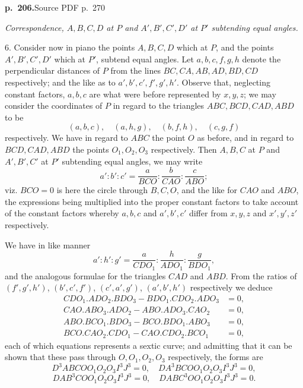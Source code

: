 \documentclass[11pt,a4paper]{article}
\newcommand{\sourcepage}[2]{\par\bigskip\noindent\textbf{p.~#1.}\hfill{\footnotesize Source PDF p.~#2}\par\nobreak\medskip}
\begin{document}
\sourcepage{206}{270}
\begin{center}\textit{Correspondence, $A,B,C,D$ at $P$ and $A',B',C',D'$ at $P'$ subtending equal angles.}\end{center}

6. Consider now in piano the points $A,B,C,D$ which at $P$, and the points $A',B',C',D'$ which at $P'$, subtend equal angles. Let $a,b,c,f,g,h$ denote the perpendicular distances of $P$ from the lines $BC,CA,AB,AD,BD,CD$ respectively; and the like as to $a',b',c',f',g',h'$. Observe that, neglecting constant factors, $a,b,c$ are what were before represented by $x,y,z$; we may consider the coordinates of $P$ in regard to the triangles $ABC,BCD,CAD,ABD$ to be
\[
(a,b,c),\quad (a,h,g),\quad (b,f,h),\quad (c,g,f)
\]
respectively. We have in regard to $ABC$ the point $O$ as before, and in regard to $BCD,CAD,ABD$ the points $O_1,O_2,O_3$ respectively. Then $A,B,C$ at $P$ and $A',B',C'$ at $P'$ subtending equal angles, we may write
\[
a':b':c'=\frac{a}{BCO}:\frac{b}{CAO}:\frac{c}{ABO};
\]
viz. $BCO=0$ is here the circle through $B,C,O$, and the like for $CAO$ and $ABO$, the expressions being multiplied into the proper constant factors to take account of the constant factors whereby $a,b,c$ and $a',b',c'$ differ from $x,y,z$ and $x',y',z'$ respectively.

We have in like manner
\[
a':h':g'=\frac{a}{CDO_1}:\frac{h}{ADO_1}:\frac{g}{BDO_1},
\]
and the analogous formulae for the triangles $CAD$ and $ABD$. From the ratios of $(f',g',h')$, $(b',c',f')$, $(c',a',g')$, $(a',b',h')$ respectively we deduce
\begin{align*}
CDO_1.ADO_2.BDO_3-BDO_1.CDO_2.ADO_3&=0,\\
CAO.ABO_3.ADO_2-ABO.ADO_3.CAO_2&=0,\\
ABO.BCO_1.BDO_3-BCO.BDO_1.ABO_3&=0,\\
BCO.CAO_2.CDO_1-CAO.CDO_2.BCO_1&=0,
\end{align*}
each of which equations represents a sextic curve; and admitting that it can be shown that these pass through $O,O_1,O_2,O_3$ respectively, the forms are
\[
D^3ABCOO_1O_2O_3I^3J^3=0,\quad
DA^3BCOO_1O_2O_3I^3J^3=0,
\]
\[
DAB^3COO_1O_2O_3I^3J^3=0,\quad
DABC^3OO_1O_2O_3I^3J^3=0.
\]
\end{document}
